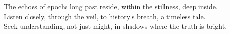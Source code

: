 \documentclass{article}
\begin{document}
\begin{infobox}
The echoes of epochs long past reside, within the stillness, deep inside.\\
Listen closely, through the veil, to history's breath, a timeless tale.\\
Seek understanding, not just might, in shadows where the truth is bright.
\end{infobox}
\end{document}
